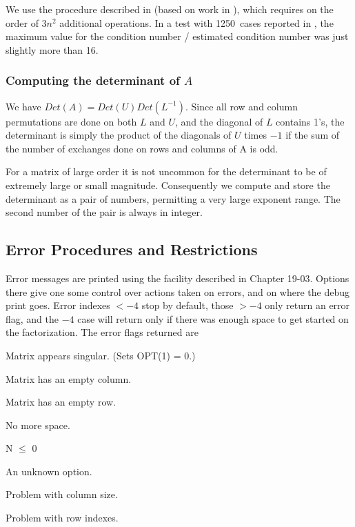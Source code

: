 \documentclass[twoside]{MATH77}
\begin{document}
We use the procedure described in \cite[pp.\ 128--130]{Golub:1996:GVL}
(based on work in \cite{Dongarra:1979:LUG}), which requires on the
order of $3n^2$ additional operations.  In a test with 1250~cases
reported in \cite{Dongarra:1979:LUG}, the maximum value for the
condition number / estimated condition number was just slightly more
than 16.

\subsubsection{Computing the determinant of $A$}

We have $Det(A) = Det(U) Det(L^{-1})$.  Since all row and column
permutations are done on both $L$ and $U$, and the diagonal of $L$
contains 1's, the determinant is simply the product of the diagonals
of $U$ times $-1$ if the sum of the number of exchanges done on rows
and columns of A is odd.\normalsize


For a matrix of large order it is not uncommon for the determinant to
be of extremely large or small magnitude. Consequently we compute and
store the determinant as a pair of numbers, permitting a very large
exponent range.  The second number of the pair is always in integer.





\subsection{Error Procedures and Restrictions}
\label{sec:errors}
Error messages are printed using the facility described in Chapter
19-03.  Options there give one some control over actions taken on
errors, and on where the debug print goes.  Error indexes $<-4$ stop
by default, those $>-4$ only return an error flag, and the $-4$ case
will return only if there was enough space to get started on the
factorization.  The error flags returned are

\begin{description}
\setlength{\parsep}{0pt} \setlength{\itemsep}{-3pt}
\item[$-1$] Matrix appears singular.  (Sets OPT(1) = 0.)
\item[$-2$] Matrix has an empty column.
\item[$-3$] Matrix has an empty row.
\item[$-4$] No more space.
\item[$-5$] N $\leq$ 0
\item[$-6$] An unknown option.
\item[$-7$] Problem with column size.
\item[$-8$] Problem with row indexes.
\end{description}
\end{document}

